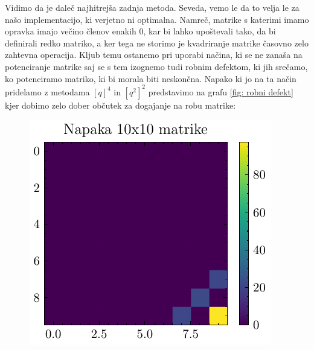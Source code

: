 \documentclass[slovene,11pt,a4paper]{article}
\begin{document}
Vidimo da je daleč najhitrejša zadnja metoda. Seveda, vemo le da to velja le za našo implementacijo, ki verjetno ni optimalna. Namreč, matrike s katerimi imamo opravka imajo večino členov enakih 0, kar bi lahko upoštevali tako, da bi definirali redko matriko, a ker tega ne storimo je kvadriranje matrike časovno zelo zahtevna operacija. Kljub temu ostanemo pri uporabi načina, ki se ne zanaša na potenciranje matrike saj se s tem izognemo tudi robnim defektom, ki jih srečamo, ko potenciramo matriko, ki bi morala biti neskončna. Napako ki jo na ta način pridelamo z metodama $\left[q\right]^4$ in $\left[q^2\right]^2$ predstavimo na grafu \ref{fig: robni defekt} kjer dobimo zelo dober občutek za dogajanje na robu matrike:
\newpage
\begin{figure}[ht]
  \centering
  \begin{minipage}{0.48\textwidth}
    \centering
    \includegraphics[width=\linewidth]{graphs/err1.pdf}
    

\end{minipage}
\end{figure}
\end{document}
